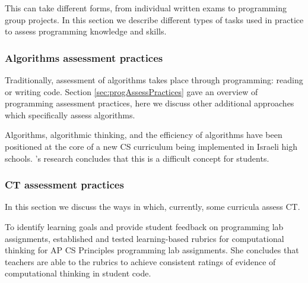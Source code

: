 This can take different forms, from individual written exams to programming group projects. In this section we describe different types of tasks used in practice to assess programming knowledge and skills.




\subsubsection{Algorithms assessment practices}
Traditionally, assessment of algorithms takes place through programming: reading or writing code. Section \ref{sec:progAssessPractices} gave an overview of programming assessment practices, here we discuss other additional approaches which specifically assess algorithms.



Algorithms, algorithmic thinking, and the efficiency of algorithms have been positioned at the core of a new CS curriculum being implemented in Israeli high schools\cite{gal2002efficiency}. \cite{gal2002efficiency}'s research concludes that this is a difficult concept for students.


\subsubsection{CT assessment practices}

In this section we discuss the ways in which, currently, some curricula assess CT.

To identify learning goals and provide student feedback on programming lab assignments,  established and tested learning-based rubrics for computational thinking for AP CS Principles programming lab assignments. She concludes that teachers are able to the rubrics to achieve consistent ratings of evidence of computational thinking in student code.

